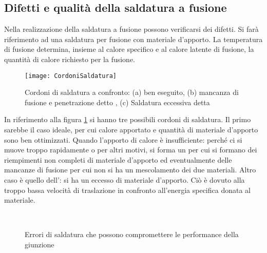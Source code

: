 \subsection{Difetti e qualità della saldatura a fusione}
Nella realizzazione della saldatura a fusione possono verificarsi dei difetti.
Si farà riferimento ad una saldatura per fusione con materiale d'apporto.
La temperatura di fusione determina, insieme al calore specifico e al calore latente di fusione, la quantità di calore richiesto per la fusione.
\begin{figure}
\centering
\texttt{[image: CordoniSaldatura]}
\caption{Cordoni di saldatura a confronto: (a) ben eseguito, (b) mancanza di fusione e penetrazione detto , (c) Saldatura eccessiva detta }
\label{fig:CordoniSaldatura}
\end{figure}
In riferimento alla figura \ref{fig:CordoniSaldatura} si hanno tre possibili cordoni di saldatura.
Il primo sarebbe il caso ideale, per cui calore apportato e quantità di materiale d'apporto sono ben ottimizzati.
Quando l'apporto di calore è insufficiente: perché ci si muove troppo rapidamente o per altri motivi, si forma un  per cui si formano dei riempimenti non completi di materiale d'apporto ed eventualmente delle mancanze di fusione per cui non si ha un mescolamento dei due materiali.
Altro caso è quello dell': si ha un eccesso di materiale d'apporto. Ciò è dovuto alla troppo bassa velocità di traslazione in confronto all'energia specifica donata al materiale.
\begin{figure}
\centering
{}\\
\caption{Errori di saldatura che possono compromettere le performance della giunzione}
\label{fig:WeldErrors}
\end{figure}

